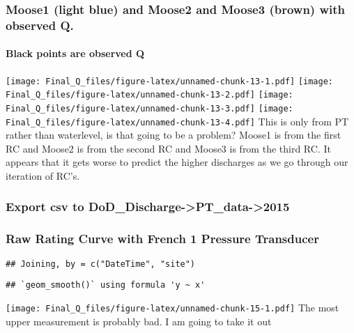 \documentclass[
]{article}
\begin{document}
\hypertarget{moose1-light-blue-and-moose2-and-moose3-brown-with-observed-q.}{%
\subsubsection{Moose1 (light blue) and Moose2 and Moose3 (brown) with
observed
Q.}\label{moose1-light-blue-and-moose2-and-moose3-brown-with-observed-q.}}

\hypertarget{black-points-are-observed-q}{%
\paragraph{Black points are observed
Q}\label{black-points-are-observed-q}}

\texttt{[image: Final\_Q\_files/figure-latex/unnamed-chunk-13-1.pdf]}
\texttt{[image: Final\_Q\_files/figure-latex/unnamed-chunk-13-2.pdf]}
\texttt{[image: Final\_Q\_files/figure-latex/unnamed-chunk-13-3.pdf]}
\texttt{[image: Final\_Q\_files/figure-latex/unnamed-chunk-13-4.pdf]} This
is only from PT rather than waterlevel, is that going to be a problem?
Moose1 is from the first RC and Moose2 is from the second RC and Moose3
is from the third RC. It appears that it gets worse to predict the
higher discharges as we go through our iteration of RC's.

\hypertarget{export-csv-to-dod_discharge-pt_data-2015-2}{%
\subsubsection{Export csv to
DoD\_Discharge-\textgreater PT\_data-\textgreater2015}\label{export-csv-to-dod_discharge-pt_data-2015-2}}

\hypertarget{raw-rating-curve-with-french-1-pressure-transducer}{%
\subsubsection{Raw Rating Curve with French 1 Pressure
Transducer}\label{raw-rating-curve-with-french-1-pressure-transducer}}

\begin{verbatim}
## Joining, by = c("DateTime", "site")
\end{verbatim}

\begin{verbatim}
## `geom_smooth()` using formula 'y ~ x'
\end{verbatim}

\texttt{[image: Final\_Q\_files/figure-latex/unnamed-chunk-15-1.pdf]} The
most upper measurement is probably bad. I am going to take it out
\end{document}
